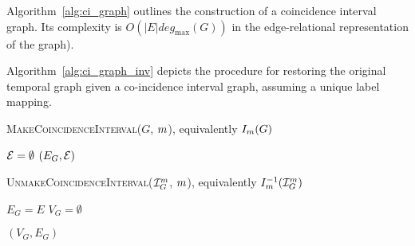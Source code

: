 Algorithm~\ref{alg:ci_graph} outlines the construction of a coincidence interval
graph. Its complexity is $O(|E|deg_{\max}(G))$ in the edge-relational
representation of the graph).

Algorithm~\ref{alg:ci_graph_inv} depicts the procedure for restoring the
original temporal graph given a co-incidence interval graph, assuming a unique
label mapping.

\begin{algorithm}
  \label{alg:ci_graph}
  \caption{\textsc{MakeCoincidenceInterval($G$, $m$)},
                      equivalently $I_{m}(G)$}
  \SetAlgoLined

  $\mathcal{E} = \emptyset$\;
  \Return $(E_G, \mathcal{E})$\;
\end{algorithm}

\begin{algorithm}
  \label{alg:ci_graph_inv}
  \caption{\textsc{UnmakeCoincidenceInterval($\mathcal{I}_{G}^{m}$,
      $m$)},  equivalently $I_{m}^{-1}(\mathcal{I}_{G}^{m})$}
  

  $E_G = E$\;
  $V_G = \emptyset$\;
  
  \Return $(V_G,E_G)$\;
\end{algorithm}


